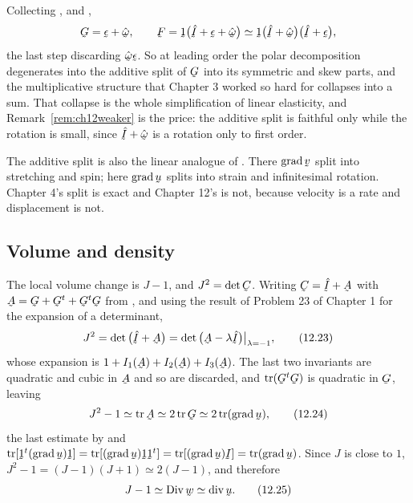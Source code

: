 \begin{remark}%
\label{rem:ch12polar}
Collecting ,  and ,
\[
   \bG=\vek{\epsilon}+\hat{\vek{\omega}},\qquad
   \bF=\shift\big(\hI+\vek{\epsilon}+\hat{\vek{\omega}}\big)
   \simeq\shift\big(\hI+\hat{\vek{\omega}}\big)
   \big(\hI+\vek{\epsilon}\big),
\]
the last step discarding
$\hat{\vek{\omega}}\vek{\epsilon}$. So at leading order the polar
decomposition degenerates into the additive split of $\bG$ into its
symmetric and skew parts, and the multiplicative structure that
Chapter 3 worked so hard for collapses into a sum. That collapse is the
whole simplification of linear elasticity, and
Remark~\ref{rem:ch12weaker} is the price: the additive split is
faithful only while the rotation is small, since
$\hI+\hat{\vek{\omega}}$ is a rotation only to first order.

The additive split is also the linear analogue of . There
$\grad\bv$ split into stretching and spin; here $\grad\bu$ splits into
strain and infinitesimal rotation. Chapter 4's split is exact and
Chapter 12's is not, because velocity is a rate and displacement is
not.
\end{remark}

\subsection*{Volume and density}

The local volume change is $J-1$, and $J^{2}=\det\bC$. Writing
$\bC=\hI+\bA$ with $\bA=\bG+\bG^{t}+\bG^{t}\bG$ from , and
using the result of Problem 23 of Chapter 1 for the expansion of a
determinant,
\begin{equation}
   J^{2}=\det\big(\hI+\bA\big)
   =\det\big(\bA-\lambda\hI\big)\big|_{\lambda=-1},
   \tag{12.23}\label{eq:12.23}
\end{equation}
whose expansion is $1+I_{1}(\bA)+I_{2}(\bA)+I_{3}(\bA)$. The last two
invariants are quadratic and cubic in $\bA$ and so are discarded, and
$\tr(\bG^{t}\bG)$ is quadratic in $\bG$, leaving
\begin{equation}
   J^{2}-1\simeq\tr\bA\simeq2\tr\bG\simeq2\tr(\grad\bu),
   \tag{12.24}\label{eq:12.24}
\end{equation}
the last estimate by  and
$\tr[\shift^{t}(\grad\bu)\shift]=\tr[(\grad\bu)\shift\shift^{t}]
=\tr[(\grad\bu)\I]=\tr(\grad\bu)$. Since $J$ is close to $1$,
$J^{2}-1=(J-1)(J+1)\simeq2(J-1)$, and therefore
\begin{equation}
   J-1\simeq\Dvg\bw\simeq\dvg\bu .
   \tag{12.25}\label{eq:12.25}
\end{equation}

